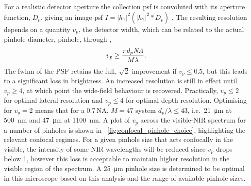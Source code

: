 \documentclass{article}
\begin{document}
For a realistic detector aperture the collection \gls{psf} is convoluted with its aperture function, $D_p$, giving an image \gls{psf} $I=|h_1|^2(|h_2|^2\ast D_p)$ \cite{wilson1987size}. The resulting resolution depends on a quantity $v_p$, the detector width, which can be related to the actual pinhole diameter, \gls{pinhole}, through \cite{wilson1987size},
\begin{equation}
	v_p \geq \frac{\pi d_p \mathit{NA}}{M \lambda}.
\end{equation}
The \gls{fwhm} of the PSF retains the full, $\sqrt{2}$ improvement if $v_p\leq0.5$, but this leads to a significant loss in brightness. An increased resolution is still in effect until $v_p\geq4$, at which point the wide-field behaviour is recovered. Practically, $v_p\leq2$ for optimal lateral resolution and $v_p\leq4$ for optimal depth resolution. Optimising for $v_p=2$ means that for a 0.7\,NA, $M=47$ system $d_p/\lambda\leq43$, i.e.\ \SI{21}{\micro\metre} at \SI{500}{nm} and \SI{47}{\micro\metre} at \SI{1100}{nm}. A plot of $v_p$ across the visible-NIR spectrum for a number of pinholes is shown in \figurename~\ref{fig:confocal_pinhole_choice}, highlighting the relevant confocal regimes. For a given pinhole size that acts confocally in the visible, the intensity of some NIR wavelengths will be reduced since $v_p$ drops below 1, however this loss is acceptable to maintain higher resolution in the visible region of the spectrum. A \SI{25}{\micro\metre} pinhole size is determined to be optimal in this microscope based on this analysis and the range of available pinhole sizes.
\end{document}
